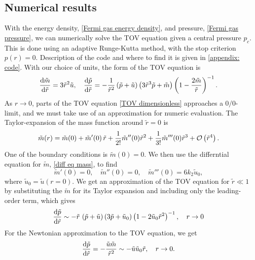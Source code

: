 \subsection{Numerical results}

With the energy density, \autoref{Fermi gas energy density}, and pressure, \autoref{Fermi gas pressure}, we can numerically solve the TOV equation given a central pressure $p_c$. 
This is done using an adaptive Runge-Kutta method, with the stop criterion $p(r) = 0$.
Description of the code and where to find it is given in \autoref{appendix: code}.
With our choice of units, the form of the TOV equation is
%
\begin{align}
    \odv{\tilde m}{\tilde r} 
    = 3 \tilde r^2 \tilde u, \quad
    \odv{\tilde p}{\tilde r} 
     = - \frac{1}{\tilde r^2} \left(\tilde p + \tilde u\right) 
    \left(3  \tilde r^3 \tilde p + \tilde m\right) 
    \left(1 - \frac{2 \tilde m}{\tilde r}\right)^{-1}.
\end{align}
%
As $r \rightarrow 0$, parts of the TOV equation \autoref{TOV dimensionless} approaches a $0/0$-limit, and we must take use of an approximation for numeric evaluation.
The Taylor-expansion of the mass function around $\tilde r = 0$ is
%
\begin{equation}
    \tilde m(r) = \tilde m(0) + \tilde m'(0) \, \tilde r + \frac{1}{2!} \tilde m''(0) \tilde r^2
    + \frac{1}{3!} \tilde m'''(0) \tilde r^3 + \mathcal O\left(\tilde r^4\right).
\end{equation}
%
One of the boundary conditions is $\tilde m(0) = 0$.
We then use the differntial equation for $\tilde m$, \autoref{diff eq mass}, to find
%
\begin{equation}
    \tilde m'(0) = 0, \quad
    \tilde m''(0) = 0, \quad
    \tilde m'''(0) = 6 k_2 \tilde u_0,
\end{equation}
%
where $\tilde u_0 = \tilde u(r = 0)$.
We get an approximation of the TOV equation for $\tilde r \ll 1$ by substituting the $\tilde m$ for its Taylor expansion and including only the leading-order term, which gives
%
\begin{equation}
    \odv{\tilde p}{\tilde r}
    \sim - \tilde r \, \left(\tilde p + \tilde u\right)
    \left( 3 \tilde p + \tilde u_0  \right)
    \left(1 - 2 \tilde u_0 \tilde r^2\right)^{-1}, \quad r\rightarrow 0
\end{equation}
%
For the Newtonian approximation to the TOV equation, we get
%
\begin{equation}
    \odv{\tilde p}{\tilde r} = -\frac{\tilde u \tilde m}{\tilde r^2}
    \sim - \tilde u \tilde u_0 \tilde r,  \quad r\rightarrow 0.
\end{equation}


